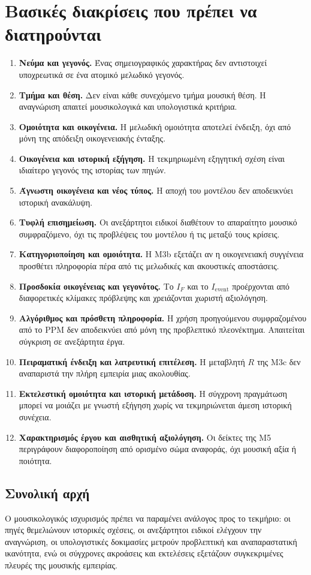 \documentclass[11pt,a4paper]{extarticle}
\begin{document}
\section{Βασικές διακρίσεις που πρέπει να διατηρούνται}
\begin{enumerate}
\item \textbf{Νεύμα και γεγονός.} Ένας σημειογραφικός χαρακτήρας δεν αντιστοιχεί υποχρεωτικά σε ένα ατομικό μελωδικό γεγονός.
\item \textbf{Τμήμα και θέση.} Δεν είναι κάθε συνεχόμενο τμήμα μουσική θέση. Η αναγνώριση απαιτεί μουσικολογικά και υπολογιστικά κριτήρια.
\item \textbf{Ομοιότητα και οικογένεια.} Η μελωδική ομοιότητα αποτελεί ένδειξη, όχι από μόνη της απόδειξη οικογενειακής ένταξης.
\item \textbf{Οικογένεια και ιστορική εξήγηση.} Η τεκμηριωμένη εξηγητική σχέση είναι ιδιαίτερο γεγονός της ιστορίας των πηγών.
\item \textbf{Άγνωστη οικογένεια και νέος τύπος.} Η αποχή του μοντέλου δεν αποδεικνύει ιστορική ανακάλυψη.
\item \textbf{Τυφλή επισημείωση.} Οι ανεξάρτητοι ειδικοί διαθέτουν το απαραίτητο μουσικό συμφραζόμενο, όχι τις προβλέψεις του μοντέλου ή τις μεταξύ τους κρίσεις.
\item \textbf{Κατηγοριοποίηση και ομοιότητα.} Η M3b εξετάζει αν η οικογενειακή συγγένεια προσθέτει πληροφορία πέρα από τις μελωδικές και ακουστικές αποστάσεις.
\item \textbf{Προσδοκία οικογένειας και γεγονότος.} Το \(I_F\) και το \(I_{\mathrm{event}}\) προέρχονται από διαφορετικές κλίμακες πρόβλεψης και χρειάζονται χωριστή αξιολόγηση.
\item \textbf{Αλγόριθμος και πρόσθετη πληροφορία.} Η χρήση προηγούμενου συμφραζομένου από το PPM δεν αποδεικνύει από μόνη της προβλεπτικό πλεονέκτημα. Απαιτείται σύγκριση σε ανεξάρτητα έργα.
\item \textbf{Πειραματική ένδειξη και λατρευτική επιτέλεση.} Η μεταβλητή \(R\) της M3c δεν αναπαριστά την πλήρη εμπειρία μιας ακολουθίας.
\item \textbf{Εκτελεστική ομοιότητα και ιστορική μετάδοση.} Η σύγχρονη πραγμάτωση μπορεί να μοιάζει με γνωστή εξήγηση χωρίς να τεκμηριώνεται άμεση ιστορική συνέχεια.
\item \textbf{Χαρακτηρισμός έργου και αισθητική αξιολόγηση.} Οι δείκτες της M5 περιγράφουν διαφοροποίηση από ορισμένο σώμα αναφοράς, όχι μουσική αξία ή ποιότητα.
\end{enumerate}
\subsection*{Συνολική αρχή}
Ο μουσικολογικός ισχυρισμός πρέπει να παραμένει ανάλογος προς το τεκμήριο: οι πηγές θεμελιώνουν ιστορικές σχέσεις, οι ανεξάρτητοι ειδικοί ελέγχουν την αναγνώριση, οι υπολογιστικές δοκιμασίες μετρούν προβλεπτική και αναπαραστατική ικανότητα, ενώ οι σύγχρονες ακροάσεις και εκτελέσεις εξετάζουν συγκεκριμένες πλευρές της μουσικής εμπειρίας.
\end{document}
